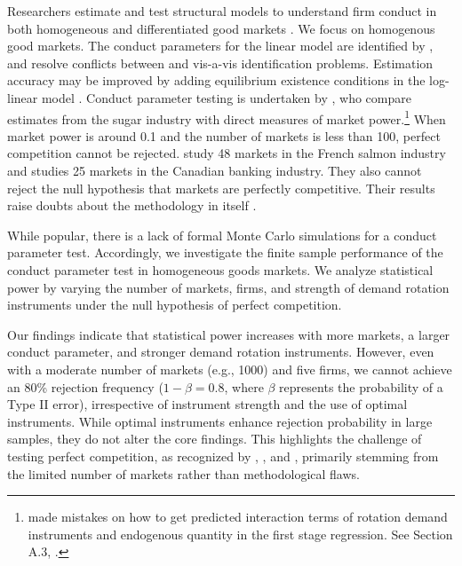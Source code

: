 \documentclass[11pt, a4paper]{article}
\begin{document}
Researchers estimate and test structural models to understand firm conduct in both homogeneous and differentiated good markets \citep{nevoIdentificationOligopolySolution1998, magnolfi2022comparison, duarte2023testing}. 
We focus on homogenous good markets. 
The conduct parameters for the linear model are identified by \citet{bresnahan1982oligopoly}, and \cite{matsumura2023resolving} resolve conflicts between \cite{bresnahan1982oligopoly} and \cite{perloff2012collinearity} vis-a-vis identification problems. 
Estimation accuracy may be improved by adding equilibrium existence conditions in the log-linear model \citep{matsumura2023mpec}. 
Conduct parameter testing is undertaken by \cite{genesove1998testing}, who compare estimates from the sugar industry with direct measures of market power.\footnote{\cite{genesove1998testing} made mistakes on how to get predicted interaction terms of rotation demand instruments and endogenous quantity in the first stage regression. See Section A.3, \cite{matsumura2023resolving}.} 
When market power is around 0.1 and the number of markets is less than 100, perfect competition cannot be rejected. 
\cite{steen1999testing} study 48 markets in the French salmon industry and \cite{shaffer1993test} studies 25 markets in the Canadian banking industry. 
They also cannot reject the null hypothesis that markets are perfectly competitive. 
Their results raise doubts about the methodology in itself \citep{shafferMarketPowerCompetition2017}.


While popular, there is a lack of formal Monte Carlo simulations for a conduct parameter test. 
Accordingly, we investigate the finite sample performance of the conduct parameter test in homogeneous goods markets. 
We analyze statistical power by varying the number of markets, firms, and strength of demand rotation instruments under the null hypothesis of perfect competition.

Our findings indicate that statistical power increases with more markets, a larger conduct parameter, and stronger demand rotation instruments. 
However, even with a moderate number of markets (e.g., 1000) and five firms, we cannot achieve an 80\% rejection frequency ($1-\beta=0.8$, where $\beta$ represents the probability of a Type II error), irrespective of instrument strength and the use of optimal instruments. While optimal instruments enhance rejection probability in large samples, they do not alter the core findings. 
This highlights the challenge of testing perfect competition, as recognized by \cite{genesove1998testing}, \cite{steen1999testing}, and \cite{shaffer1993test}, primarily stemming from the limited number of markets rather than methodological flaws.
\end{document}
